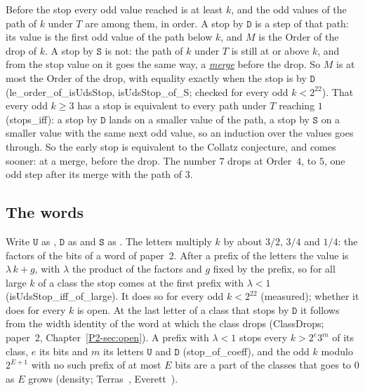 \documentclass[10pt,a4paper,titlepage]{article}
\makeatletter
\newcommand{\termhere}[1]{\leavevmode
  \Hy@raisedlink{\hyper@anchorstart{term:#1}\hyper@anchorend}}
\newcommand{\keyterm}[2]{\hyperlink{box:#1}{\emph{#2}}}
\newcommand{\lean}[1]{\textsf{#1}}
\makeatother
\begin{document}
Before the stop every odd value reached is at least $k$, and the odd values of the path of
$k$ under $T$ are among them, in order. A stop by $\mathtt{D}$ is a step of that path: its
value is the first odd value of the path below $k$, and $M$ is the Order of the drop of
$k$. \termhere{merge}A stop by $\mathtt{S}$ is not: the path of $k$ under $T$ is still at or above $k$, and
from the stop value on it goes the same way, a \keyterm{merge}{merge} before the drop. So $M$ is at most the
Order of the drop, with equality exactly when the stop is by $\mathtt{D}$ (\lean{le\_order\_of\_isUdsStop}, \lean{isUdsStop\_of\_S}; checked
for every odd $k < 2^{22}$). That every odd $k \ge 3$ has a stop is equivalent to every
path under $T$ reaching $1$ (\lean{stops\_iff}): a stop by $\mathtt{D}$ lands on a smaller
value of the path, a stop by $\mathtt{S}$ on a smaller value with the same next odd value,
so an induction over the values goes through. So the early stop is equivalent to the
Collatz conjecture, and comes sooner: at a merge, before the drop. The number $7$ drops at Order~$4$, to $5$, one odd step after
its merge with the path of $3$.

\subsection*{The words}

Write $\mathtt{U}$ as , $\mathtt{D}$ as  and $\mathtt{S}$ as . The
letters multiply $k$ by about $3/2$, $3/4$ and $1/4$: the factors of the bits of a word of
paper~2. After a prefix of the letters the value is $\lambda\,k + g$, with $\lambda$ the product of the
factors and $g$ fixed by the prefix, so for all large $k$ of a class the stop comes at the
first prefix with $\lambda < 1$ (\lean{isUdsStop\_iff\_of\_large}). It does so for every odd $k < 2^{22}$ (measured); whether
it does for every $k$ is open. At the last letter of a class that stops by $\mathtt{D}$ it
follows from the width identity of the word at which the class drops (\lean{ClassDrops};
paper~2, Chapter~\ref{P2-sec:open}). A prefix with $\lambda < 1$ stops every $k > 2^e 3^m$ of its
class, $e$ its bits and $m$ its letters $\mathtt{U}$ and $\mathtt{D}$ (\lean{stop\_of\_coeff}),
and the odd $k$ modulo $2^{E+1}$ with no such prefix of at most $E$ bits are a part of the classes that goes
to $0$ as $E$ grows (\lean{density}; Terras~\cite{Terras1976}, Everett~\cite{Everett1977}).
\end{document}
